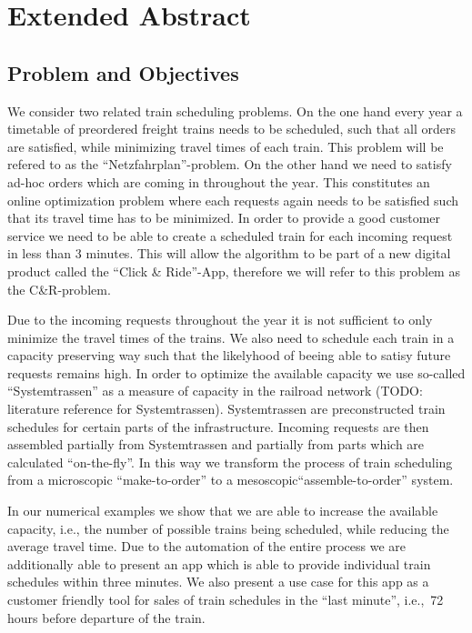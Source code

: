 \section{Extended Abstract}
\label{chap:extAbs}

\subsection{Problem and Objectives}
We consider two related train scheduling problems. On the one hand every year a timetable of preordered freight trains needs to be scheduled, such that all orders are satisfied, while minimizing travel times of each train. This problem will be refered to as the ``Netzfahrplan''-problem. On the other hand we need to satisfy ad-hoc orders which are coming in throughout the year. This constitutes an online optimization problem where each requests again needs to be satisfied such that its travel time has to be minimized. In order to provide a good customer service we need to be able to create a scheduled train for each incoming request in less than 3 minutes. This will allow the algorithm to be part of a new digital product called the ``Click \& Ride''-App, therefore we will refer to this problem as the C\&R-problem.

Due to the incoming requests throughout the year it is not sufficient to only minimize the travel times of the trains. We also need to schedule each train in a capacity preserving way such that the likelyhood of beeing able to satisy future requests remains high. In order to optimize the available capacity we use so-called ``Systemtrassen'' as a measure of capacity in the railroad network (TODO: literature reference for Systemtrassen). Systemtrassen are preconstructed train schedules for certain parts of the infrastructure. Incoming requests are then assembled partially from Systemtrassen and partially from parts which are calculated ``on-the-fly''.
In this way we transform the process of train scheduling from a microscopic ``make-to-order'' to a mesoscopic``assemble-to-order'' system.

In our numerical examples we show that we are able to increase the available capacity, i.e., the number of possible trains being scheduled, while reducing the average travel time. Due to the automation of the entire process we are additionally able to present an app which is able to provide individual train schedules within three minutes. We also present a use case for this app as a customer friendly tool for sales of train schedules in the ``last minute'', i.e.,\ 72 hours before departure of the train.


